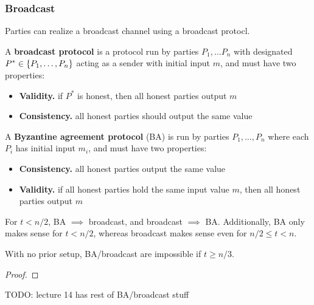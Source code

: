 \subsubsection{Broadcast}

Parties can realize a broadcast channel using a broadcast protocl.

\begin{defn}
A \textbf{broadcast protocol} is a protocol run by parties $P_1, \dots  P_n$ with designated $P^* \in \left\{P_1, \dots, P_n\right\}$ acting as a sender with initial input $m$, and must have two properties:
\begin{itemize}
\item \textbf{Validity.} if $P^*$ is honest, then all honest parties output $m$
\item \textbf{Consistency.} all honest parties should output the same value
\end{itemize}
\end{defn}

\begin{defn}
A \textbf{Byzantine agreement protocol} (BA) is run by parties $P_1, \dots, P_n$ where each $P_i$ has initial input $m_i$, and must have two properties:
\begin{itemize}
\item \textbf{Consistency.} all honest parties output the same value 
\item \textbf{Validity.} if all honest parties hold the same input value $m$, then all honest parties output $m$
\end{itemize}
\end{defn}

For $t < n/2$, BA $\implies$ broadcast, and broadcast $\implies$ BA.
Additionally, BA only makes sense for $t < n/2$, whereas broadcast makes sense even for $n/2 \leq t < n$.

\begin{lem}
With no prior setup, BA/broadcast are impossible if $t \geq n/3$.
\end{lem}
\begin{proof}
\end{proof}

TODO: lecture 14 has rest of BA/broadcast stuff